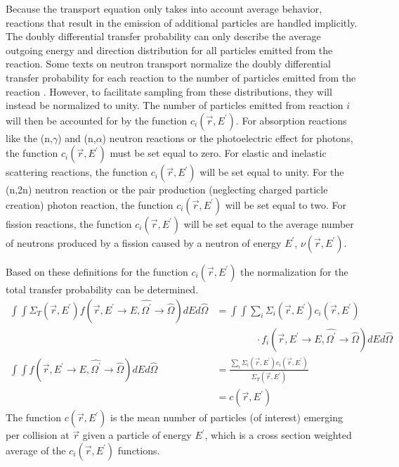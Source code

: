 Because the transport equation only takes into account average behavior, 
reactions that result in the emission of additional particles are handled 
implicitly. The doubly differential transfer probability can only describe the
average outgoing energy and direction distribution for all particles emitted
from the reaction. Some texts on neutron transport normalize the doubly
differential transfer probability for each reaction to the number of particles 
emitted from the reaction \citep{bell_nuclear_1979}. However, to facilitate 
sampling from these distributions, they will instead be normalized to unity. 
The number of particles emitted from reaction $i$ will then be accounted for by 
the function $c_i(\vec{r},E^{'})$. For absorption reactions like the 
(n,$\gamma$) and (n,$\alpha$) neutron reactions or the photoelectric effect for 
photons, the function $c_i(\vec{r},E^{'})$ must be set equal to zero. For 
elastic and inelastic scattering reactions, the function $c_i(\vec{r},E^{'})$ 
will be set equal to unity. For the (n,2n) neutron reaction or the pair 
production (neglecting charged particle creation) photon reaction, the function 
$c_i(\vec{r},E^{'})$ will be set equal to two. For fission reactions, the 
function $c_i(\vec{r},E^{'})$ will be set equal to the average number of 
neutrons produced by a fission caused by a neutron of energy 
$E^{'}$, $\nu(\vec{r},E^{'})$.

Based on these definitions for the function $c_i(\vec{r},E^{'})$ the 
normalization for the total transfer probability can be determined.
\begin{align}
  \int\int   \Sigma_T(\vec{r},E^{'})
  f(\vec{r},E^{'} \to E,\hat{\Omega^{'}} \to \hat{\Omega}) 
  dEd\hat{\Omega}
  & = \int\int \sum_i \Sigma_i(\vec{r},E^{'}) c_i(\vec{r},E^{'}) \nonumber \\
  & \qquad \quad \quad \cdot  
  f_i(\vec{r},E^{'} \to E,\hat{\Omega^{'}} \to \hat{\Omega}) 
  dEd\hat{\Omega} \nonumber \\
  \int\int f(\vec{r},E^{'} \to E,\hat{\Omega^{'}} \to \hat{\Omega}) 
  dEd\hat{\Omega} 
  & = \frac{\sum_i \Sigma_i(\vec{r},E^{'}) c_i(\vec{r},E^{'})}
             {\Sigma_T(\vec{r},E^{'})} \nonumber \\
  & = c(\vec{r},E^{'}) 
\end{align}
The function $c(\vec{r},E^{'})$ is the mean number of particles (of 
interest) emerging per collision at $\vec{r}$ given a particle of energy 
$E^{'}$, which is a cross section weighted average of the $c_i(\vec{r},E^{'})$
functions.
  

